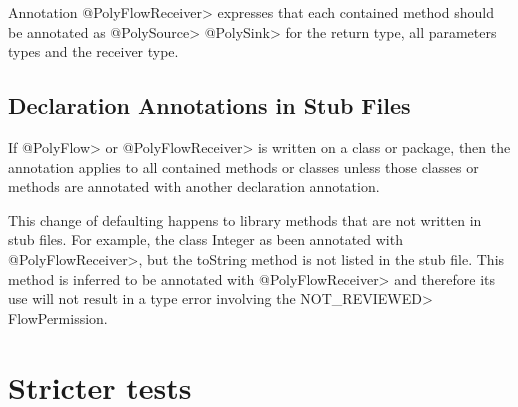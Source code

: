 Annotation \<@PolyFlowReceiver> expresses that each contained method should be annotated as \<@PolySource> \<@PolySink> for the return type, all parameters types and the receiver type.

\subsection{Declaration Annotations in Stub Files\label{sec:declannosstubfiles}}
If \<@PolyFlow> or \<@PolyFlowReceiver> is written on a class or package, then the annotation applies
 to all contained methods or classes unless those classes or methods are annotated with another 
 declaration annotation.   

This change of defaulting happens to library methods that are not written in stub files.  For example, the class
 Integer as been annotated with  \<@PolyFlowReceiver>, but the toString method is not listed in the stub file.  
 This method is inferred to be annotated with  \<@PolyFlowReceiver> and therefore its use will not result in a 
 type error  involving the \<NOT\_REVIEWED> FlowPermission. 
 




%
%
%




\section{Stricter tests\label{sec:stricter}}

